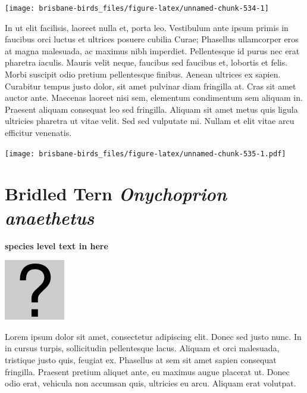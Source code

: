 \documentclass[]{book}
\let\origfigure\figure
\let\endorigfigure\endfigure
\renewenvironment{figure}[1][2] {
  \expandafter\origfigure\expandafter[H]
} {
  \endorigfigure
}
\begin{document}
\begin{figure}
\texttt{[image: brisbane-birds\_files/figure-latex/unnamed-chunk-534-1]} \caption{insert figure caption}\label{fig:unnamed-chunk-534}
\end{figure}

In ut elit facilisis, laoreet nulla et, porta leo. Vestibulum ante ipsum
primis in faucibus orci luctus et ultrices posuere cubilia Curae;
Phasellus ullamcorper eros at magna malesuada, ac maximus nibh
imperdiet. Pellentesque id purus nec erat pharetra iaculis. Mauris velit
neque, faucibus sed faucibus et, lobortis et felis. Morbi suscipit odio
pretium pellentesque finibus. Aenean ultrices ex sapien. Curabitur
tempus justo dolor, sit amet pulvinar diam fringilla at. Cras sit amet
auctor ante. Maecenas laoreet nisi sem, elementum condimentum sem
aliquam in. Praesent aliquam consequat leo sed fringilla. Aliquam sit
amet metus quis ligula ultricies pharetra ut vitae velit. Sed sed
vulputate mi. Nullam et elit vitae arcu efficitur venenatis.

\begin{figure}
\centering
\texttt{[image: brisbane-birds\_files/figure-latex/unnamed-chunk-535-1.pdf]}
\caption{\label{fig:unnamed-chunk-535}insert figure caption}
\end{figure}

\section{\texorpdfstring{Bridled Tern \emph{Onychoprion
anaethetus}}{Bridled Tern Onychoprion anaethetus}}\label{bridled-tern-onychoprion-anaethetus}

\textbf{species level text in here}

\begin{figure}
\centering
\includegraphics{assets/missing.png}
\caption{No image for species}
\end{figure}

Lorem ipsum dolor sit amet, consectetur adipiscing elit. Donec sed justo
nunc. In in cursus turpis, sollicitudin pellentesque lacus. Aliquam et
orci malesuada, tristique justo quis, feugiat ex. Phasellus at sem sit
amet sapien consequat fringilla. Praesent pretium aliquet ante, eu
maximus augue placerat ut. Donec odio erat, vehicula non accumsan quis,
ultricies eu arcu. Aliquam erat volutpat.
\end{document}
